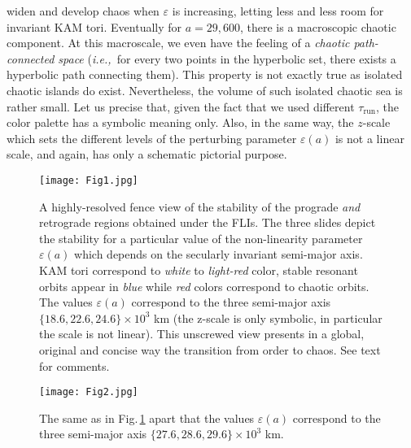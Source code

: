 \documentclass{amsart}
\theoremstyle{definition}
\theoremstyle{remark}
\numberwithin{equation}{section}
\newcommand{\ie}{\textit{i.e.,\ }}
\begin{document}
 widen and develop chaos when $\varepsilon$ is increasing, letting less and less room for invariant KAM tori. 
Eventually for $a=29,600$, there is a macroscopic chaotic component. At this macroscale, we even have the feeling of a \textit{chaotic path-connected space} (\ie for every two points in the hyperbolic set, there exists a hyperbolic path connecting them). This property is not exactly true as isolated chaotic islands do exist. Nevertheless, the volume of such isolated chaotic sea  is rather small. 
Let us precise that, given the fact that we used different $\tau_{\textrm{run}}$, the color palette has a symbolic meaning only. Also, in the same way, the $z$-scale which sets the different levels of the perturbing parameter $\varepsilon(a)$ is not a linear scale, and again, has only a schematic pictorial purpose.  


\begin{figure}
\centering
\texttt{[image: Fig1.jpg]}
\caption{\label{Fig:FenceProgradeFLIs-part1} A highly-resolved fence view of the stability of the prograde \textit{and} retrograde regions obtained under the FLIs.  The three slides depict the stability for a particular value of the {\color{black} non-linearity} parameter $\varepsilon(a)$ which depends on the secularly invariant semi-major axis. 
KAM tori correspond to {\it white} to {\it light-red} color, stable resonant orbits appear in {\it blue} while {\it red} colors correspond to chaotic orbits. 
The values $\varepsilon(a)$
correspond to the three semi-major axis $\{18.6,22.6,24.6\} \times 10^{3}$ km (the z-scale is only symbolic, in particular the scale is not linear).
This unscrewed view presents in a global, original and concise way the transition from order to chaos. See text for comments.
}
\end{figure}

\begin{figure}
\centering
\texttt{[image: Fig2.jpg]}
\caption{\label{Fig:FenceProgradeFLIs-part2} The same as in Fig.\,\ref{Fig:FenceProgradeFLIs-part1}
apart that  
the values $\varepsilon(a)$
correspond to the three semi-major axis $\{27.6,28.6,29.6\} \times 10^{3}$ km.
}
\end{figure}
\end{document}
